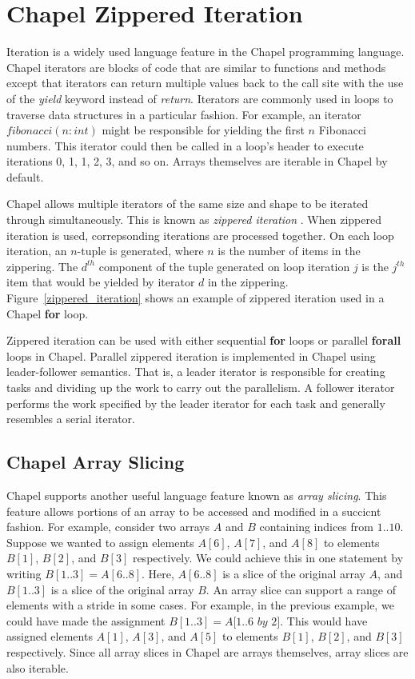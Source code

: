 \section{Chapel Zippered Iteration}\label{sec:zippered_iteration}

Iteration is a widely used language feature in the Chapel programming language. Chapel iterators are blocks of code that are similar to functions and methods except that iterators can return multiple values back to the call site with the use of the \textit{yield} keyword instead of \textit{return}. Iterators are commonly used in loops to traverse data structures in a particular fashion. For example, an iterator $fibonacci(n: int)$ might be responsible for yielding the first $n$ Fibonacci numbers. This iterator could then be called in a loop's header to execute iterations 0, 1, 1, 2, 3, and so on.  Arrays themselves are iterable in Chapel by default. 

Chapel allows multiple iterators of the same size and shape to be iterated through simultaneously. This is known as \textit{zippered iteration} \cite{chamberlain2011user}. When zippered iteration is used, correpsonding iterations are processed together. On each loop iteration, an $n$-tuple is generated, where $n$ is the number of items in the zippering. The $d^{th}$ component of the tuple generated on loop iteration $j$ is the $j^{th}$ item that would be yielded by iterator $d$ in the zippering. Figure~\ref{zippered_iteration} shows an example of zippered iteration used in a Chapel \textbf{for} loop. 

Zippered iteration can be used with either sequential \textbf{for} loops or parallel \textbf{forall} loops in Chapel. Parallel zippered iteration is implemented in Chapel using leader-follower semantics. That is, a leader iterator is responsible for creating tasks and dividing up the work to carry out the parallelism. A follower iterator performs the work specified by the leader iterator for each task and generally resembles a  serial iterator. 

\subsection{Chapel Array Slicing}\label{sec:array_slicing}

Chapel supports another useful language feature known as \textit{array slicing}. This feature allows portions of an array to be accessed and modified in a succicnt fashion. For example, consider two arrays $A$ and $B$ containing indices from $1..10$. Suppose we wanted to assign elements $A[6]$, $A[7]$, and $A[8]$ to elements $B[1]$, $B[2]$, and $B[3]$ respectively. We could achieve this in one statement by writing $B[1..3] = A[6..8]$. Here, $A[6..8]$ is a slice of the original array $A$, and $B[1..3]$ is a slice of the original array $B$. An array slice can support a range of elements with a stride in some cases. For example, in the previous example, we could have made the assignment $B[1..3] = A[1..6$  $by$  $2]$. This would have assigned elements $A[1]$, $A[3]$, and $A[5]$ to elements $B[1]$, $B[2]$, and $B[3]$ respectively. Since all array slices in Chapel are arrays themselves, array slices are also iterable. 


